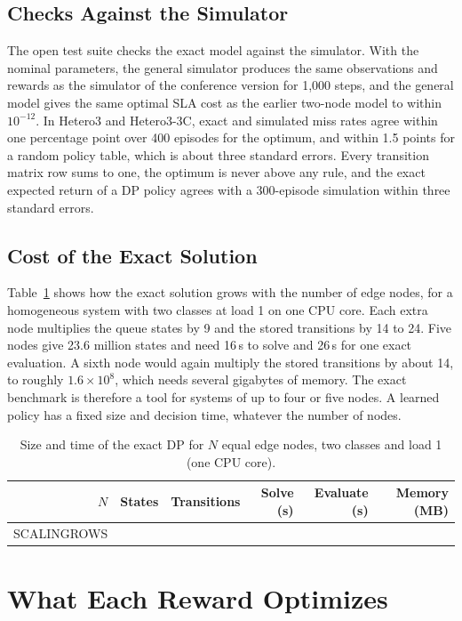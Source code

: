 \subsection{Checks Against the Simulator}
The open test suite checks the exact model against the simulator. With the nominal parameters, the general simulator produces the same observations and rewards as the simulator of the conference version for 1,000 steps, and the general model gives the same optimal SLA cost as the earlier two-node model to within $10^{-12}$. In Hetero3 and Hetero3-3C, exact and simulated miss rates agree within one percentage point over 400 episodes for the optimum, and within 1.5 points for a random policy table, which is about three standard errors. Every transition matrix row sums to one, the optimum is never above any rule, and the exact expected return of a DP policy agrees with a 300-episode simulation within three standard errors.

\subsection{Cost of the Exact Solution}
Table~\ref{tab:scaling} shows how the exact solution grows with the number of edge nodes, for a homogeneous system with two classes at load 1 on one CPU core. Each extra node multiplies the queue states by 9 and the stored transitions by 14 to 24. Five nodes give 23.6 million states and need 16\,s to solve and 26\,s for one exact evaluation. A sixth node would again multiply the stored transitions by about 14, to roughly $1.6\times10^8$, which needs several gigabytes of memory. The exact benchmark is therefore a tool for systems of up to four or five nodes. A learned policy has a fixed size and decision time, whatever the number of nodes.

\begin{table}[t]
\caption{Size and time of the exact DP for $N$ equal edge nodes, two classes and load 1 (one CPU core).}
\label{tab:scaling}
\centering
\footnotesize
\setlength{\tabcolsep}{3pt}
\begin{tabular}{@{}rrrrrr@{}}
\toprule
$N$ & States & Transitions & Solve (s) & Evaluate (s) & Memory (MB) \\
\midrule
SCALINGROWS
\bottomrule
\end{tabular}
\end{table}

\section{What Each Reward Optimizes}
\label{sec:reward}

